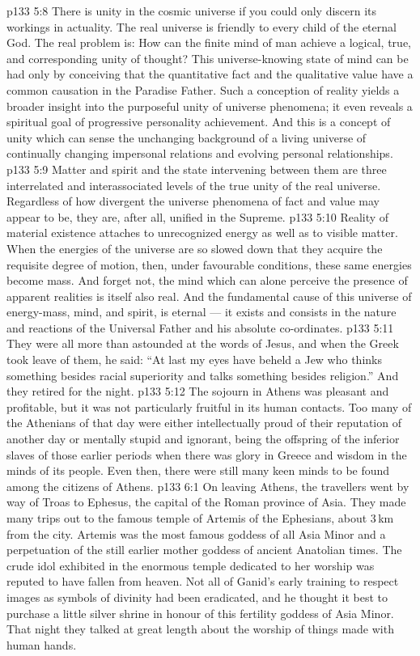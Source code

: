 \vs p133 5:8 There is unity in the cosmic universe if you could only discern its workings in actuality. The real universe is friendly to every child of the eternal God. The real problem is: How can the finite mind of man achieve a logical, true, and corresponding unity of thought? This universe\hyp{}knowing state of mind can be had only by conceiving that the quantitative fact and the qualitative value have a common causation in the Paradise Father. Such a conception of reality yields a broader insight into the purposeful unity of universe phenomena; it even reveals a spiritual goal of progressive personality achievement. And this is a concept of unity which can sense the unchanging background of a living universe of continually changing impersonal relations and evolving personal relationships.
\vs p133 5:9 Matter and spirit and the state intervening between them are three interrelated and interassociated levels of the true unity of the real universe. Regardless of how divergent the universe phenomena of fact and value may appear to be, they are, after all, unified in the Supreme.
\vs p133 5:10 Reality of material existence attaches to unrecognized energy as well as to visible matter. When the energies of the universe are so slowed down that they acquire the requisite degree of motion, then, under favourable conditions, these same energies become mass. And forget not, the mind which can alone perceive the presence of apparent realities is itself also real. And the fundamental cause of this universe of energy\hyp{}mass, mind, and spirit, is eternal --- it exists and consists in the nature and reactions of the Universal Father and his absolute co\hyp{}ordinates.
\vs p133 5:11 \pc They were all more than astounded at the words of Jesus, and when the Greek took leave of them, he said: “At last my eyes have beheld a Jew who thinks something besides racial superiority and talks something besides religion.” And they retired for the night.
\vs p133 5:12 The sojourn in Athens was pleasant and profitable, but it was not particularly fruitful in its human contacts. Too many of the Athenians of that day were either intellectually proud of their reputation of another day or mentally stupid and ignorant, being the offspring of the inferior slaves of those earlier periods when there was glory in Greece and wisdom in the minds of its people. Even then, there were still many keen minds to be found among the citizens of Athens.
\vs p133 6:1 On leaving Athens, the travellers went by way of Troas to Ephesus, the capital of the Roman province of Asia. They made many trips out to the famous temple of Artemis of the Ephesians, about 3\,km from the city. Artemis was the most famous goddess of all Asia Minor and a perpetuation of the still earlier mother goddess of ancient Anatolian times. The crude idol exhibited in the enormous temple dedicated to her worship was reputed to have fallen from heaven. Not all of Ganid’s early training to respect images as symbols of divinity had been eradicated, and he thought it best to purchase a little silver shrine in honour of this fertility goddess of Asia Minor. That night they talked at great length about the worship of things made with human hands.
